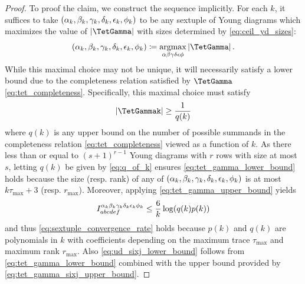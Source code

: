 \documentclass[notitlepage, 10pt]{article}
\begin{document}
\begin{proof}
    To proof the claim, we construct the sequence implicitly.
    For each $k$, it suffices to take $(\alpha_k, \beta_k, \gamma_k, \delta_k, \epsilon_k, \phi_k)$ to be any sextuple of Young diagrams which maximizes the value of $\abs{\TetGamma}$ with sizes determined by \cref{eq:ceil_yd_sizes}:
    \begin{equation}
        (\ya_k, \yb_k, \yc_k, \yd_k, \ye_k, \yf_k) \coloneqq \underset{\ya\yb\yc\yd\ye\yf}{\argmax} \abs{\TetGamma}.
    \end{equation}
    While this maximal choice may not be unique, it will necessarily satisfy a lower bound due to the completeness relation satisfied by $\TetGamma$ \cref{eq:tet_completeness}.
    Specifically, this maximal choice must satisfy
    \begin{equation}
        \label{eq:tet_gamma_lower_bound}
        \abs{\TetGammak} \geq \frac{1}{q(k)}
    \end{equation}
    where $q(k)$ is any upper bound on the number of possible summands in the completeness relation \cref{eq:tet_completeness} viewed as a function of $k$.
    As there less than or equal to $(s+1)^{r-1}$ Young diagrams with $r$ rows with size at most $s$, letting $q(k)$ be given by \cref{eq:q_of_k} ensures \cref{eq:tet_gamma_lower_bound} holds because the size (resp. rank) of any of $(\alpha_k, \beta_k, \gamma_k, \delta_k, \epsilon_k, \phi_k)$ is at most $k \tau_{\max} + 3$ (resp. $r_{\max}$).
    Moreover, applying \cref{eq:tet_gamma_upper_bound} yields
    \begin{equation}
        I^{\alpha_k\beta_k\gamma_k\delta_k\epsilon_k\phi_k}_{abcdef}
        \leq \frac{6}{k}\log (q(k)p(k))
    \end{equation}
    and thus \cref{eq:sextuple_convergence_rate} holds because $p(k)$ and $q(k)$ are polynomials in $k$ with coefficients depending on the maximum trace $\tau_{\max}$ and maximum rank $r_{\max}$.
    Also \cref{eq:ud_sixj_lower_bound} follows from \cref{eq:tet_gamma_lower_bound} combined with the upper bound provided by \cref{eq:tet_gamma_sixj_upper_bound}.
\end{proof}
\end{document}
